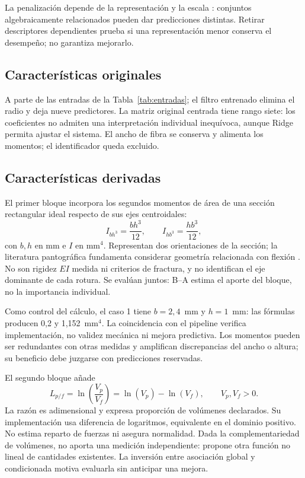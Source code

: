 La penalización depende de la representación y la escala \cite{hoerl1970}: conjuntos algebraicamente relacionados pueden dar predicciones distintas. Retirar descriptores dependientes prueba si una representación menor conserva el desempeño; no garantiza mejorarlo.

\subsection{Características originales}
A parte de las entradas de la Tabla~\ref{tab:entradas}; el filtro entrenado elimina el radio y deja nueve predictores. La matriz original centrada tiene rango siete: los coeficientes no admiten una interpretación individual inequívoca, aunque Ridge permita ajustar el sistema. El ancho de fibra se conserva y alimenta los momentos; el identificador queda excluido.

\subsection{Características derivadas}
El primer bloque incorpora los segundos momentos de área de una sección rectangular ideal respecto de sus ejes centroidales:
\begin{equation}
I_{bh^3}=\frac{bh^3}{12},\qquad I_{hb^3}=\frac{hb^3}{12},
\label{eq:momentos}
\end{equation}
con $b,h$ en mm e $I$ en mm$^4$. Representan dos orientaciones de la sección; la literatura pantográfica fundamenta considerar geometría relacionada con flexión \cite{turco2017,turco2019}. No son rigidez $EI$ medida ni criterios de fractura, y no identifican el eje dominante de cada rotura. Se evalúan juntos: B--A estima el aporte del bloque, no la importancia individual.

Como control del cálculo, el caso 1 tiene $b=2{,}4$~mm y $h=1$~mm: las fórmulas producen 0,2 y 1,152~mm$^4$. La coincidencia con el pipeline verifica implementación, no validez mecánica ni mejora predictiva. Los momentos pueden ser redundantes con otras medidas y amplifican discrepancias del ancho o altura; su beneficio debe juzgarse con predicciones reservadas.

El segundo bloque añade
\begin{equation}
L_{p/f}=\ln\!\left(\frac{V_p}{V_f}\right)=\ln(V_p)-\ln(V_f),\qquad V_p,V_f>0.
\label{eq:logratio}
\end{equation}
La razón es adimensional y expresa proporción de volúmenes declarados. Su implementación usa diferencia de logaritmos, equivalente en el dominio positivo. No estima reparto de fuerzas ni asegura normalidad. Dada la complementariedad de volúmenes, no aporta una medición independiente: propone otra función no lineal de cantidades existentes. La inversión entre asociación global y condicionada motiva evaluarla sin anticipar una mejora.

